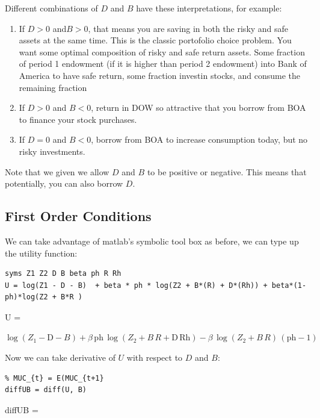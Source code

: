 \documentclass[
]{book}
\begin{document}
Different combinations of \(D\) and \(B\) have these interpretations, for
example:

\begin{enumerate}
\def\labelenumi{\arabic{enumi}.}
\item
  If \(D>0\) and\(B>0\), that means you are saving in both the risky and
  safe assets at the same time. This is the classic portofolio choice
  problem. You want some optimal composition of risky and safe return
  assets. Some fraction of period 1 endowment (if it is higher than
  period 2 endowment) into Bank of America to have safe return, some
  fraction investin stocks, and consume the remaining fraction
\item
  If \(D>0\) and \(B<0\), return in DOW so attractive that you borrow from
  BOA to finance your stock purchases.
\item
  If \(D=0\) and \(B<0\), borrow from BOA to increase consumption today,
  but no risky investments.
\end{enumerate}

Note that we given we allow \(D\) and \(B\) to be positive or negative. This
means that potentially, you can also borrow \(D\).

\hypertarget{first-order-conditions}{%
\subsection{First Order Conditions}\label{first-order-conditions}}

We can take advantage of matlab's symbolic tool box as before, we can
type up the utility function:

\begin{verbatim}
syms Z1 Z2 D B beta ph R Rh
U = log(Z1 - D - B)  + beta * ph * log(Z2 + B*(R) + D*(Rh)) + beta*(1-ph)*log(Z2 + B*R )
\end{verbatim}

U =

\(\displaystyle \log \left(Z_1 -\textrm{D}-B\right)+\beta \,\textrm{ph}\,\log \left(Z_2 +B\,R+\textrm{D}\,\textrm{Rh}\right)-\beta \,\log \left(Z_2 +B\,R\right)\,{\left(\textrm{ph}-1\right)}\)

Now we can take derivative of \(U\) with respect to \(D\) and \(B\):

\begin{verbatim}
% MUC_{t} = E(MUC_{t+1}
diffUB = diff(U, B)
\end{verbatim}

diffUB =
\end{document}

